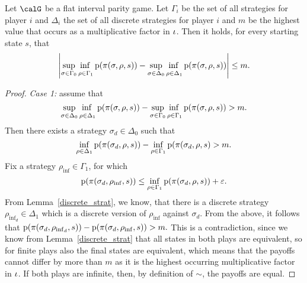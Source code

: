 \documentclass[fleqn,envcountsame]{LMCS}
\begin{document}
\begin{prop} \label{values_close}
Let $\calG$ be a flat interval parity game. Let $\Gamma_i$ be the set
of all strategies for player $i$ and $\Delta_i$ the set of all discrete
strategies for player $i$ and $m$ be the highest value that occurs as
a multiplicative factor in $\iota$. 
Then it holds, for every starting state $s$, that
\[ \left| \adjustlimits\sup_{\sigma \in \Gamma_0} \inf_{\rho \in \Gamma_1}
      \pay(\pi(\sigma, \rho,s)) - 
  \adjustlimits \sup_{\sigma \in \Delta_0} \inf_{\rho \in \Delta_1}
      \pay(\pi(\sigma, \rho,s)) \right| \leq m. \]
\end{prop}

\begin{proof}
\emph{Case 1:} assume that
\[ \adjustlimits \sup_{\sigma \in \Delta_0} \inf_{\rho \in \Delta_1} \pay(\pi(\sigma, \rho,s)) - 
\adjustlimits \sup_{\sigma \in \Gamma_0} \inf_{\rho \in \Gamma_1}
      \pay(\pi(\sigma, \rho,s)) > m. \]
Then there exists a strategy
$\sigma_d \in \Delta_0$ such that 
\[  \inf_{\rho \in \Delta_1} \mathrm{p}(\pi(\sigma_d, \rho,s))
  - \inf_{\rho \in \Gamma_1} \mathrm{p}(\pi(\sigma_d, \rho,s) > m.\] 
Fix a strategy $\rho_{\inf} \in \Gamma_1$, for which 
 \[\mathrm{p}(\pi(\sigma_d, \rho_{\inf},s)) \leq  \inf_{\rho \in \Gamma_1} \mathrm{p}(\pi(\sigma_d, \rho,s))+ \varepsilon.\]
From Lemma~\ref{discrete_strat}, we know, that there is a discrete
strategy $\rho_{\inf_d} \in \Delta_1$ which is a discrete version
of $\rho_{\inf}$ against $\sigma_d$. From the above, it follows that 
$\mathrm{p}(\pi(\sigma_d, \rho_{\inf_d},s))- \mathrm{p}(\pi(\sigma_d, \rho_{\inf},s)) > m.$ 
This is a contradiction, since we know from Lemma~\ref{discrete_strat} that
all states in both plays are equivalent, so for finite plays also the final
states are equivalent, which means that the payoffs cannot differ by more
than $m$ as it is the highest occurring multiplicative factor in $\iota$. If
both plays are infinite, then, by definition of $\sim$, the payoffs are equal.


\end{proof}
\end{document}
